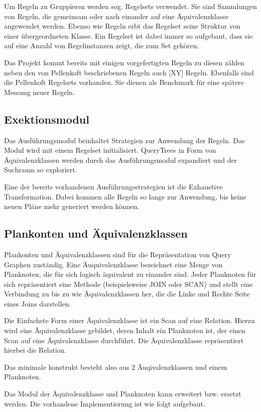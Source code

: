 Um Regeln zu Gruppieren werden sog. Regelsets verwendet. Sie sind Sammlungen von Regeln, die gemeinsam oder nach einander auf eine Äquivalenzklasse angewendet werden. Ebenso wie Regeln erbt das Regelset seine Struktur von einer übergeordneten Klasse. Ein Regelset ist dabei immer so aufgebaut, dass sie auf eine Anzahl von Regelinstanzen zeigt, die zum Set gehören.

Das Projekt kommt bereits mit einigen vorgefertigten Regeln zu diesen zählen neben den von Pellenkoft \cite{} beschriebenen Regeln auch [XY] Regeln. Ebenfalls sind die Pellenkoft Regelsets vorhanden. Sie dienen als Benchmark für eine spätere Messung neuer Regeln.


\subsection{Exektionsmodul}

Das Ausführungsmodul beinhaltet Strategien zur Anwendung der Regeln. Das Modul wird mit einem Regelset initialisiert. QueryTrees in Form von Äquivalenzklassen werden durch das Ausführungsmodul expandiert und der Suchraum so exploriert.

Eine der bereits vorhandenen Ausführungsstrategien ist die Exhaustive Transformation. Dabei kommen alle Regeln so lange zur Anwendung, bis keine neuen Pläne mehr generiert werden können.


\subsection{Plankonten und Äquivalenzklassen}

Plankonten und Äquivalenzklassen sind für die Repräsentation von Query Graphen zuständig. Eine Äuquivalenzklasse bezeichnet eine Menge von Planknoten, die für sich logisch äquivalent zu einander sind. Jeder Planknoten für sich repräsentiert eine Methode (beispielsweise JOIN oder SCAN) und stellt eine Verbindung zu bis zu wie Äquivalenzklassen her, die die Linke und Rechte Seite eines Joins darstellen.

Die Einfachste Form einer Äquivalenzklasse ist ein Scan auf eine Relation. Hierzu wird eine Äquivalenzklasse gebildet, deren Inhalt ein Planknoten ist, der einen Scan auf eine Äquivalenzklasse durchführt. Die Äquivalenzklasse repräsentiert hierbei die Relation.

Das minimale konstrukt besteht also aus 2 Äuqivalenzklassen und einem Planknoten.


Das Modul der Äquivalenzklasse und Planknoten kann erweitert bzw. ersetzt werden. Die vorhandene Implementierung ist wie folgt aufgebaut.

